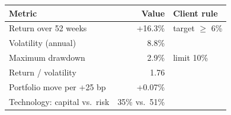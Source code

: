 \begin{tabular}{@{}lrl@{}}
\toprule
\textbf{Metric} & \textbf{Value} & \textbf{Client rule} \\
\midrule
Return over 52 weeks & +16.3\% & target $\geq$ 6\% \\
Volatility (annual) & 8.8\% &  \\
Maximum drawdown & \textminus{}2.9\% & limit 10\% \\
Return / volatility & 1.76 &  \\
Portfolio move per +25 bp & +0.07\% &  \\
Technology: capital vs.\ risk & 35\% vs.\ 51\% &  \\
\bottomrule
\end{tabular}